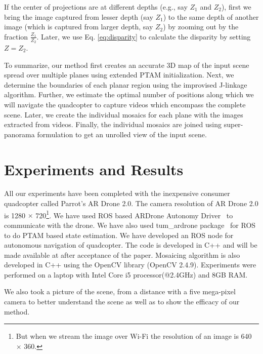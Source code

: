 If the center of projections are at different depths (e.g., say $Z_1$ and
$Z_2$), first we bring the image captured from lesser depth (say $Z_1$) to the
same depth of another image (which is captured from larger depth, say $Z_2$) by
zooming out by the fraction $\frac{Z_1}{Z_2}$. Later, we use Eq.
\ref{eq:disparity} to calculate the disparity by setting $Z=Z_2$.

To summarize, our method first creates an accurate 3D map of the input scene
spread over multiple planes using extended PTAM initialization. Next, we determine the
boundaries of each planar region using the improvised J-linkage algorithm.
Further, we estimate the optimal number of positions along which we will navigate the
quadcopter to capture videos which encompass the complete scene. Later, we
create the individual mosaics for each plane with the images extracted from
videos. Finally, the individual mosaics are joined using super-panorama
formulation to get an unrolled view of the input scene.

\section{Experiments and Results}
All our experiments have been completed with the inexpensive consumer
quadcopter called  Parrot’s AR Drone 2.0. The camera resolution of AR Drone 2.0
is 1280 $\times$ 720\footnote{But when we stream the image over Wi-Fi the resolution
of an image is 640 $\times$ 360.}. We have used ROS based ARDrone Autonomy
Driver~\cite{ardroneDriver} to communicate with the drone. We have also used
tum\_ardrone package~\cite{tumardrone} for ROS to do PTAM based state
estimation. We have developed an ROS node for autonomous navigation of
quadcopter. The code is developed in C++ and will be made available at
after acceptance of the paper. Mosaicing algorithm is also
developed in C++ using the OpenCV library (OpenCV 2.4.9). Experiments were
performed on a laptop with Intel Core i5 processor(@2.4GHz) and 8GB RAM.

We also took a picture of the scene, from a distance with a five mega-pixel
camera to better understand the scene as well as to show the efficacy of
our method.

